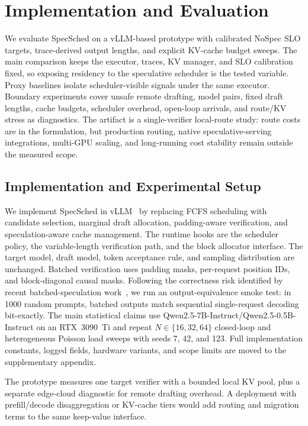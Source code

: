 \documentclass[journal]{IEEEtran}
\newcommand{\system}{SpecSched}
\begin{document}
\section{Implementation and Evaluation}
\label{sec:impl-eval}

We evaluate \system{} on a vLLM-based prototype with calibrated NoSpec
SLO targets, trace-derived output lengths, and explicit KV-cache budget
sweeps. The main comparison keeps the executor, traces, KV manager, and
SLO calibration fixed, so exposing residency to the speculative
scheduler is the tested variable. Proxy baselines isolate
scheduler-visible signals under the same executor. Boundary experiments
cover unsafe remote drafting, model pairs, fixed draft lengths, cache
budgets, scheduler overhead, open-loop arrivals, and route/KV stress as
diagnostics. The artifact is a single-verifier local-route study: route
costs are in the formulation, but production routing, native
speculative-serving integrations, multi-GPU scaling, and long-running
cost stability remain outside the measured scope.

\subsection{Implementation and Experimental Setup}
\label{sec:impl}
\label{sec:varlen-verification}
\label{sec:exp-setup}

We implement \system{} in vLLM~\cite{kwon2023efficient} by replacing
FCFS scheduling with candidate selection, marginal draft allocation,
padding-aware verification, and speculation-aware cache management.
The runtime hooks are the scheduler policy, the variable-length
verification path, and the block allocator interface. The target model,
draft model, token acceptance rule, and sampling distribution are
unchanged. Batched verification uses padding masks, per-request
position IDs, and block-diagonal causal masks. Following the correctness
risk identified by recent batched-speculation work~\cite{zhang2025batchspec},
we run an output-equivalence smoke test: in 1000 random prompts, batched
outputs match sequential single-request decoding bit-exactly.
The main statistical claims use Qwen2.5-7B-Instruct/Qwen2.5-0.5B-Instruct
on an RTX~3090~Ti and repeat $N\in\{16,32,64\}$ closed-loop and
heterogeneous Poisson load sweeps with seeds 7, 42, and 123. Full
implementation constants, logged fields, hardware variants, and scope
limits are moved to the supplementary appendix.

The prototype measures one target verifier with a bounded local KV pool,
plus a separate edge-cloud diagnostic for remote drafting overhead. A
deployment with prefill/decode disaggregation or KV-cache tiers would
add routing and migration terms to the same keep-value interface.
\end{document}
